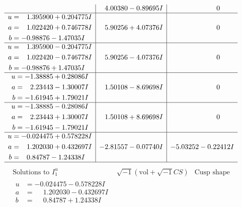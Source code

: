 \documentclass[1p]{elsarticle_modified}
\theoremstyle{definition}
\newcommand{\I}{\sqrt{-1}}
\begin{document}
$$\begin{array}{c|c|c}
 & \phantom{-}4.00380 - 0.89695 I & \phantom{-0.000000 } 0 \\ \hline\begin{aligned}
u &= \phantom{-}1.395900 + 0.204775 I \\
a &= \phantom{-}1.022420 + 0.746778 I \\
b &= -0.98876 - 1.47035 I\end{aligned}
 & \phantom{-}5.90256 + 4.07376 I & \phantom{-0.000000 } 0 \\ \hline\begin{aligned}
u &= \phantom{-}1.395900 - 0.204775 I \\
a &= \phantom{-}1.022420 - 0.746778 I \\
b &= -0.98876 + 1.47035 I\end{aligned}
 & \phantom{-}5.90256 - 4.07376 I & \phantom{-0.000000 } 0 \\ \hline\begin{aligned}
u &= -1.38885 + 0.28086 I \\
a &= \phantom{-}2.23443 - 1.30007 I \\
b &= -1.61945 + 1.79021 I\end{aligned}
 & \phantom{-}1.50108 - 8.69698 I & \phantom{-0.000000 } 0 \\ \hline\begin{aligned}
u &= -1.38885 - 0.28086 I \\
a &= \phantom{-}2.23443 + 1.30007 I \\
b &= -1.61945 - 1.79021 I\end{aligned}
 & \phantom{-}1.50108 + 8.69698 I & \phantom{-0.000000 } 0 \\ \hline\begin{aligned}
u &= -0.024475 + 0.578228 I \\
a &= \phantom{-}1.202030 + 0.432697 I \\
b &= \phantom{-}0.84787 - 1.24338 I\end{aligned}
 & -2.81557 - 0.07740 I & -5.03252 - 0.22412 I\\
 \hline 
 \end{array}$$\newpage$$\begin{array}{c|c|c}  
\text{Solutions to }I^u_{1}& \I (\text{vol} + \sqrt{-1}CS) & \text{Cusp shape}\\
 \hline 
\begin{aligned}
u &= -0.024475 - 0.578228 I \\
a &= \phantom{-}1.202030 - 0.432697 I \\
b &= \phantom{-}0.84787 + 1.24338 I\end{aligned}

\end{array}$$
\end{document}
